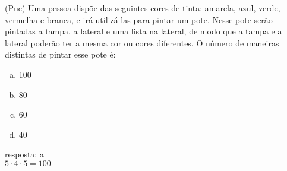 \begin{ex}
  (Puc) Uma pessoa dispõe das seguintes cores de tinta: amarela, azul, verde, vermelha e branca, e irá utilizá-las para pintar um pote. Nesse pote serão pintadas a tampa, a lateral e uma lista na lateral, de modo que a tampa e a lateral poderão ter a mesma cor ou cores diferentes. O número de maneiras distintas de pintar esse pote é:
      \begin{enumerate}   [(a)]
          \item 100
          \item 80
          \item 60
          \item 40
      \end{enumerate}
        \begin{sol}
        resposta: a \\
        $5\cdot4\cdot5=100$
        \end{sol}
 \end{ex}